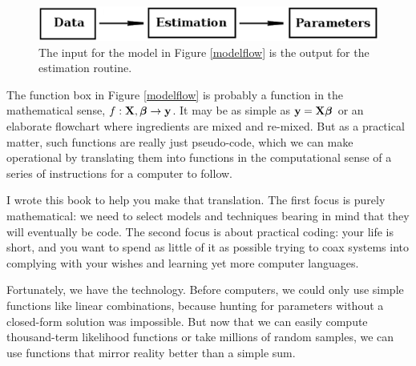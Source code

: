 \begin{figure}[htb]
\begin{center}
\includegraphics[width=\textwidth*\real{0.85}]{models2}
\end{center}

\caption{The input for the model in Figure \ref{modelflow} is the output for the estimation routine.}
\label{modelflowback}
\end{figure}


 The function box in Figure \ref{modelflow} is probably a
function in the mathematical sense, $f:{\bf X}, {\mbox{\boldmath$\beta$}} \to {\bf y}$. It may
be as simple as ${\bf y} = {\bf X}{\mbox{\boldmath$\beta$}}$ or an elaborate flowchart where
ingredients are mixed and re-mixed.  But as a practical matter, such
functions are really just pseudo-code, which we can make operational by
translating them into functions in the computational sense of a series
of instructions for a computer to follow.

I wrote this book to help you make that translation. The first focus
is purely mathematical: we need to select models and techniques bearing
in mind that they will eventually be code. The second focus is about
practical coding: your life is short, and you want to spend as little
of it as possible trying to coax systems into complying with your wishes
and learning yet more computer languages.

Fortunately, we have the technology. Before computers, we could only
use simple functions like linear combinations, because hunting for
parameters without a closed-form solution was impossible. 
But now that we can easily compute thousand-term likelihood functions
or take millions of random samples, we can use functions that mirror
reality better than a simple sum.



